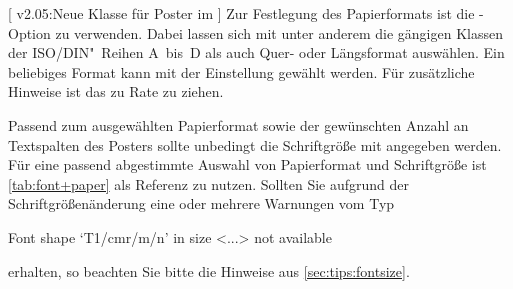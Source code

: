 \begin{DeclareEntity}{}[%
  v2.05:Neue Klasse für Poster im \TUDCD%
]
Zur Festlegung des Papierformats ist die \KOMAScript-Option 
 zu verwenden. Dabei lassen sich mit 
 unter anderem die gängigen Klassen der 
ISO/DIN"~Reihen A~bis~D als auch Quer- oder Längsformat auswählen. Ein 
beliebiges Format kann mit der Einstellung  
gewählt werden. Für zusätzliche Hinweise ist das \scrguide zu Rate zu ziehen.

Passend zum ausgewählten Papierformat sowie der gewünschten Anzahl an 
Textspalten des Posters sollte unbedingt die Schriftgröße mit 
 angegeben werden. Für eine passend abgestimmte 
Auswahl von Papierformat und Schriftgröße ist \autoref{tab:font+paper} als 
Referenz zu nutzen. Sollten Sie aufgrund der Schriftgrößenänderung eine oder 
mehrere Warnungen vom Typ
%
\begin{quoting}
\begin{Code}
Font shape `T1/cmr/m/n' in size <...> not available
\end{Code}
\end{quoting}
%
erhalten, so beachten Sie bitte die Hinweise aus \autoref{sec:tips:fontsize}.



\end{DeclareEntity}
